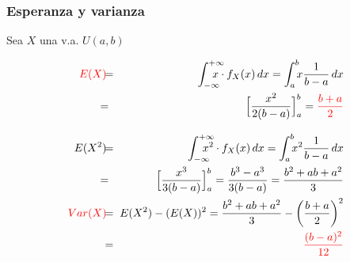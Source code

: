 \documentclass[handout]{beamer}\usepackage[]{graphicx}\usepackage[]{color}
\newcommand{\red}[1]{\textcolor{red}{#1}}
\theoremstyle{plain}
\theoremstyle{definition}
\begin{document}
\begin{frame}
\frametitle{Esperanza y varianza}
\vspace*{-2ex}

Sea $X$ una v.a. $U(a,b)$
\vspace*{-3ex}

\begin{eqnarray*}
\red{E(X)} &\hspace*{-1ex}= & \hspace*{-2ex}\int_{-\infty}^{+\infty} \hspace*{-3ex}x \cdot f_X(x)\, dx=\int_{a}^{b} \hspace*{-1ex}x \frac{1}{b-a}\, dx \\ &\hspace*{-2ex}= & \hspace*{-2ex}
\Big[\frac{x^2}{2(b-a)}\Big]_{a}^{b}=\red{\frac{b+a}{2}} \\[2ex] 
E(X^2)& \hspace*{-1ex}=  & \hspace*{-2ex} \int_{-\infty}^{+\infty} \hspace*{-3ex} x^2\cdot f_X(x)\, dx=\int_{a}^{b}  \hspace*{-1ex}x^2 \frac{1}{b-a}\, dx \\ &\hspace*{-2ex}= & \hspace*{-2ex}\Big[\frac{x^3}{3(b-a)}\Big]_{a}^{b} =\frac{b^3-a^3}{3(b-a)} = \frac{b^2+ab+a^2}{3} \\ 
\red{Var(X)} & \hspace*{-1ex}= & \hspace*{-1ex} E(X^2)-(E(X))^2=\frac{b^2+ab+a^2}{3}-\left(\frac{b+a}{2}\right)^2\\ & \hspace*{-1ex}= & \hspace*{-1ex} \red{\frac{(b-a)^2}{12}}
\end{eqnarray*}
\end{frame}
\end{document}
